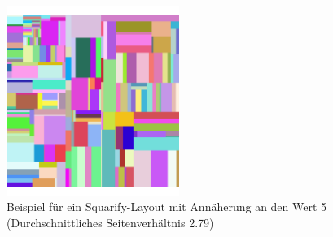 \begin{figure}[h]
    \centering
    \includegraphics[width=0.5\textwidth]{images/fiveSquarify.png}
    \caption{Beispiel für ein Squarify-Layout mit Annäherung an den Wert 5 (Durchschnittliches Seitenverhältnis 2.79)}
    \label{fig:squarifyRatio5}
\end{figure}

